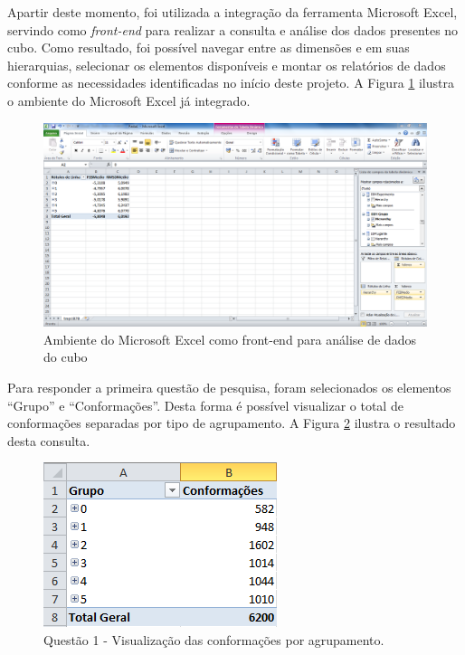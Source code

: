 Apartir deste momento, foi utilizada a integração da ferramenta Microsoft Excel, servindo como \emph{front-end} para realizar a consulta e análise dos dados presentes no cubo. Como resultado, foi possível navegar entre as dimensões e em suas hierarquias, selecionar os elementos disponíveis e montar os relatórios de dados conforme as necessidades identificadas no início deste projeto. A Figura \ref{fig:excelFull} ilustra o ambiente do Microsoft Excel já integrado.

\begin{figure}[h]
        \center
        \includegraphics[scale=0.45]{images/ExcelFull.PNG}
        \caption{Ambiente do Microsoft Excel como front-end para análise de dados do cubo}
        \label{fig:excelFull}
\end{figure}

Para responder a primeira questão de pesquisa, foram selecionados os elementos ``Grupo'' e ``Conformações''. Desta forma é possível visualizar o total de conformações separadas por tipo de agrupamento. A Figura \ref{fig:questao1} ilustra o resultado desta consulta.

\begin{figure}[h]
        \center
        \includegraphics[scale=1]{images/Questao1.PNG}
        \caption{Questão 1 - Visualização das conformações por agrupamento.}
        \label{fig:questao1}
\end{figure}

